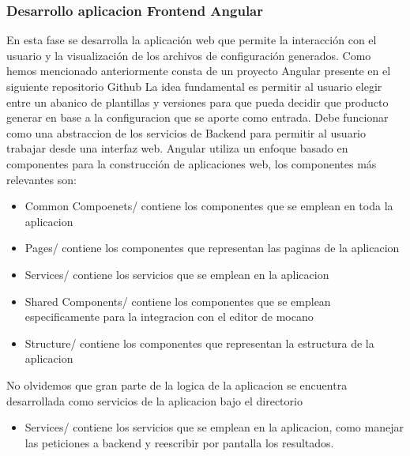 \documentclass[12pt, a4paper, twoside]{article}
\begin{document}
\subsubsection{Desarrollo aplicacion Frontend Angular}
En esta fase se desarrolla la aplicación web que permite la interacción con el usuario y la visualización de los archivos de configuración generados. Como hemos mencionado anteriormente consta de un proyecto Angular presente en el siguiente repositorio Github \cite{m4rdom_frontend}
La idea fundamental es permitir al usuario elegir entre un abanico de plantillas y versiones para que pueda decidir que producto generar en base a la configuracion que se aporte como entrada.
Debe funcionar como una abstraccion de los servicios de Backend para permitir al usuario trabajar desde una interfaz web.
Angular utiliza un enfoque basado en componentes para la construcción de aplicaciones web, los componentes más relevantes son:
\begin{itemize}
	\item Common Compoenets/ contiene los componentes que se emplean en toda la aplicacion
	\item Pages/ contiene los componentes que representan las paginas de la aplicacion
	\item Services/ contiene los servicios que se emplean en la aplicacion
	\item Shared Components/ contiene los componentes que se emplean especificamente para la integracion con el editor de mocano
	\item Structure/ contiene los componentes que representan la estructura de la aplicacion
\end{itemize}

No olvidemos que gran parte de la logica de la aplicacion se encuentra desarrollada como servicios de la aplicacion bajo el directorio 

\begin{itemize}
	\item Services/ contiene los servicios que se emplean en la aplicacion, como manejar las peticiones a backend y reescribir por pantalla los resultados.
\end{itemize}
\end{document}
